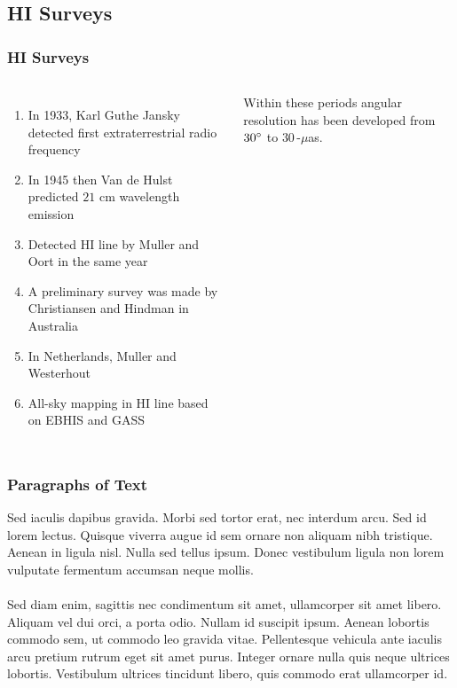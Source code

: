 \documentclass{beamer}
\begin{document}

\subsection{HI Surveys}

\begin{frame}
\frametitle{HI Surveys}
\begin{columns}[c] %

\begin{enumerate}
\item In 1933, Karl Guthe Jansky detected first extraterrestrial radio frequency\cite{jansky1933radio}
\item In 1945 then Van de Hulst predicted $21$ cm wavelength emission\cite{CJBakker1945}
\item Detected HI line by Muller and Oort in the same year\cite{muller1951observation}
\item A preliminary survey was made by Christiansen and Hindman\cite{christiansen1952preliminary} in Australia
\item In Netherlands, Muller and Westerhout\cite{Muller1957}
\item All-sky mapping in HI line based on EBHIS and GASS\cite{bekhti2016hi4pi}
\end{enumerate}

Within these periods angular resolution has been developed from $30\degree$ to $30$\,-$\mu$as\cite{kellermann2001development,Middelberg2008}.

\end{columns}
\end{frame}


\begin{frame}
\frametitle{Paragraphs of Text}
Sed iaculis dapibus gravida. Morbi sed tortor erat, nec interdum arcu. Sed id lorem lectus. Quisque viverra augue id sem ornare non aliquam nibh tristique. Aenean in ligula nisl. Nulla sed tellus ipsum. Donec vestibulum ligula non lorem vulputate fermentum accumsan neque mollis\cite{CJBakker1945}.\\~\\

Sed diam enim, sagittis nec condimentum sit amet, ullamcorper sit amet libero. Aliquam vel dui orci, a porta odio. Nullam id suscipit ipsum. Aenean lobortis commodo sem, ut commodo leo gravida vitae. Pellentesque vehicula ante iaculis arcu pretium rutrum eget sit amet purus. Integer ornare nulla quis neque ultrices lobortis. Vestibulum ultrices tincidunt libero, quis commodo erat ullamcorper id.
\end{frame}
\end{document}
